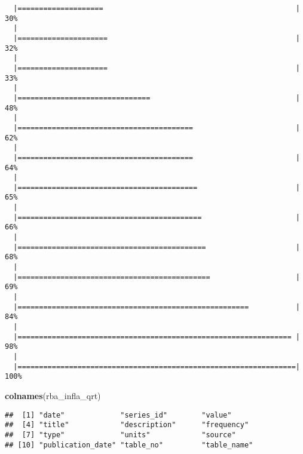 \documentclass[]{article}
\newenvironment{Shaded}{\begin{snugshade}}{\end{snugshade}}
\newcommand{\KeywordTok}[1]{\textcolor[rgb]{0.13,0.29,0.53}{\textbf{#1}}}
\newcommand{\NormalTok}[1]{#1}
\begin{document}
\begin{verbatim}
  |====================                                             |  30%
  |                                                                       
  |=====================                                            |  32%
  |                                                                       
  |=====================                                            |  33%
  |                                                                       
  |===============================                                  |  48%
  |                                                                       
  |=========================================                        |  62%
  |                                                                       
  |=========================================                        |  64%
  |                                                                       
  |==========================================                       |  65%
  |                                                                       
  |===========================================                      |  66%
  |                                                                       
  |============================================                     |  68%
  |                                                                       
  |=============================================                    |  69%
  |                                                                       
  |======================================================           |  84%
  |                                                                       
  |================================================================ |  98%
  |                                                                       
  |=================================================================| 100%
\end{verbatim}

\begin{Shaded}
\begin{Highlighting}[]
      \KeywordTok{colnames}\NormalTok{(rba_infla_qrt)}
\end{Highlighting}
\end{Shaded}

\begin{verbatim}
##  [1] "date"             "series_id"        "value"           
##  [4] "title"            "description"      "frequency"       
##  [7] "type"             "units"            "source"          
## [10] "publication_date" "table_no"         "table_name"
\end{verbatim}
\end{document}
